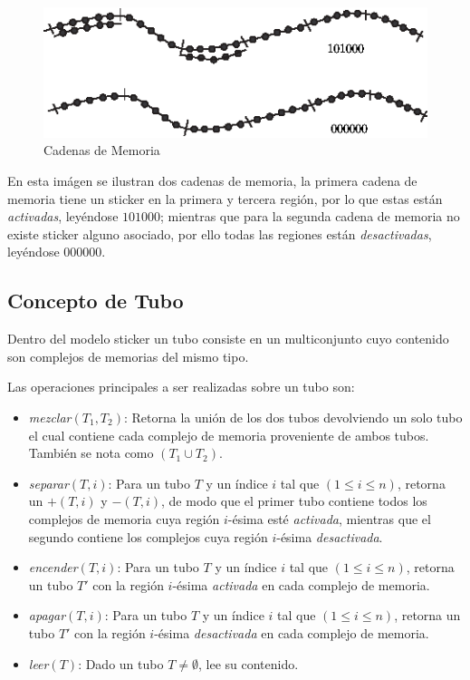 \documentclass[12pt, letterpaper, twoside]{article}
\begin{document}
    \newpage
    \begin{figure}[h!]
        \centering
        \includegraphics[width=\linewidth]{sticker.png}
        \caption{Cadenas de Memoria}
    \end{figure}

    En esta imágen se ilustran dos cadenas de memoria, la primera cadena de memoria tiene un sticker en la primera y tercera región, por lo que estas están \emph{activadas}, leyéndose $101000$; mientras que para la segunda cadena de memoria no existe sticker alguno asociado, por ello todas las regiones están \emph{desactivadas}, leyéndose $000000$.

    \subsection{Concepto de Tubo}
    Dentro del modelo sticker un tubo consiste en un multiconjunto cuyo contenido son complejos de memorias del mismo tipo.

    Las operaciones principales a ser realizadas sobre un tubo son:
    \begin{itemize}
        \item \emph{mezclar}$(T_1,T_2)$: Retorna la unión de los dos tubos devolviendo un solo tubo el cual contiene cada complejo de memoria proveniente de ambos tubos. También se nota como $(T_1\cup T_2)$.
        \item \emph{separar}$(T, i)$: Para un tubo $T$ y un índice $i$ tal que $(1 \leq i \leq n)$, retorna un $+(T, i)$ y $-(T, i)$, de modo que el primer tubo contiene todos los complejos de memoria cuya región $i$-ésima esté \emph{activada}, mientras que el segundo contiene los complejos cuya región $i$-ésima \emph{desactivada}.
        \item \emph{encender}$(T, i)$: Para un tubo $T$ y un índice $i$ tal que $(1 \leq i \leq n)$, retorna un tubo $T'$ con la región $i$-ésima \emph{activada} en cada complejo de memoria.
        \item \emph{apagar}$(T, i)$: Para un tubo $T$ y un índice $i$ tal que $(1 \leq i \leq n)$, retorna un tubo $T'$ con la región $i$-ésima \emph{desactivada} en cada complejo de memoria.
        \item \emph{leer}$(T)$: Dado un tubo $T\neq\emptyset$, lee su contenido.
    \end{itemize}
\end{document}
